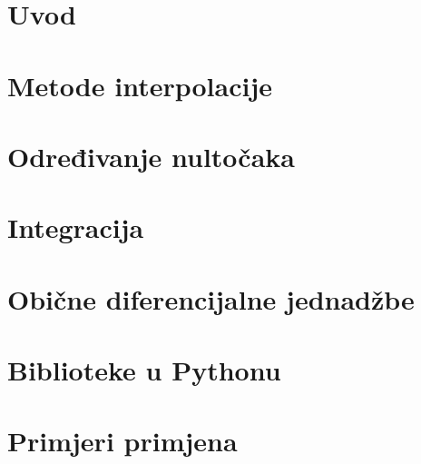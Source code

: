 \maketitle
\newpage
{}
\setcounter{page}{1}

\clearpage

\cleardoublepage
{}

\tableofcontents

\clearpage
{}

\chapter{Uvod}




\chapter{Metode interpolacije}









\chapter{Određivanje nultočaka}






\chapter{Integracija}





\chapter{Obične diferencijalne jednadžbe}



\pagebreak
{}

\chapter{Biblioteke u Pythonu}


\chapter{Primjeri primjena}

